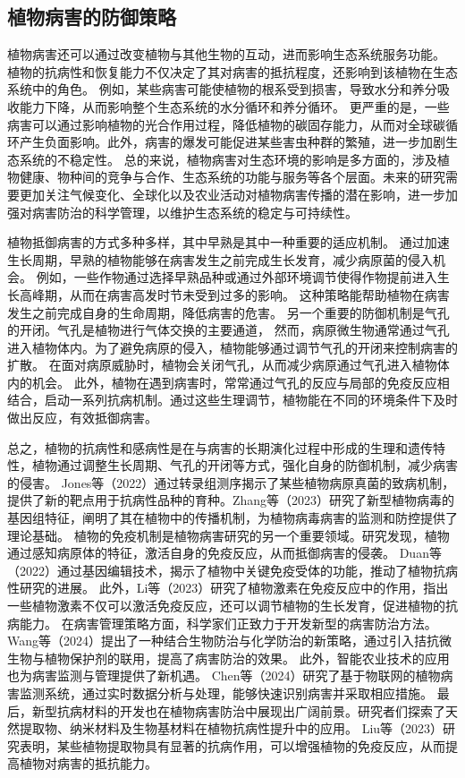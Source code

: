 \documentclass[AutoFakeBold]{LZUThesis-PgD&PhD}
\begin{document}
	
	
	\subsection{植物病害的防御策略}
	
	植物病害还可以通过改变植物与其他生物的互动，进而影响生态系统服务功能。
	植物的抗病性和恢复能力不仅决定了其对病害的抵抗程度，还影响到该植物在生态系统中的角色。
	例如，某些病害可能使植物的根系受到损害，导致水分和养分吸收能力下降，从而影响整个生态系统的水分循环和养分循环\cite{Schultz2010}。
	更严重的是，一些病害可以通过影响植物的光合作用过程，降低植物的碳固存能力，从而对全球碳循环产生负面影响\cite{Barton2011}。此外，病害的爆发可能促进某些害虫种群的繁殖，进一步加剧生态系统的不稳定性。
	总的来说，植物病害对生态环境的影响是多方面的，涉及植物健康、物种间的竞争与合作、生态系统的功能与服务等各个层面。未来的研究需要更加关注气候变化、全球化以及农业活动对植物病害传播的潜在影响，进一步加强对病害防治的科学管理，以维护生态系统的稳定与可持续性。
	
	植物抵御病害的方式多种多样，其中早熟是其中一种重要的适应机制。
	通过加速生长周期，早熟的植物能够在病害发生之前完成生长发育，减少病原菌的侵入机会。
	例如，一些作物通过选择早熟品种或通过外部环境调节使得作物提前进入生长高峰期，从而在病害高发时节未受到过多的影响。
	这种策略能帮助植物在病害发生之前完成自身的生命周期，降低病害的危害。
	另一个重要的防御机制是气孔的开闭。气孔是植物进行气体交换的主要通道，
	然而，病原微生物通常通过气孔进入植物体内。为了避免病原的侵入，植物能够通过调节气孔的开闭来控制病害的扩散。
	在面对病原威胁时，植物会关闭气孔，从而减少病原通过气孔进入植物体内的机会。
	此外，植物在遇到病害时，常常通过气孔的反应与局部的免疫反应相结合，启动一系列抗病机制。通过这些生理调节，植物能在不同的环境条件下及时做出反应，有效抵御病害。
	
	总之，植物的抗病性和感病性是在与病害的长期演化过程中形成的生理和遗传特性，植物通过调整生长周期、气孔的开闭等方式，强化自身的防御机制，减少病害的侵害。
	Jones等（2022）通过转录组测序揭示了某些植物病原真菌的致病机制，提供了新的靶点用于抗病性品种的育种\cite{jones2022}。Zhang等（2023）研究了新型植物病毒的基因组特征，阐明了其在植物中的传播机制，为植物病毒病害的监测和防控提供了理论基础\cite{zhang2023genomic}。
	植物的免疫机制是植物病害研究的另一个重要领域。研究发现，植物通过感知病原体的特征，激活自身的免疫反应，从而抵御病害的侵袭。
	Duan等（2022）通过基因编辑技术，揭示了植物中关键免疫受体的功能，推动了植物抗病性研究的进展\cite{duan2022gene}。
	此外，Li等（2023）研究了植物激素在免疫反应中的作用，指出一些植物激素不仅可以激活免疫反应，还可以调节植物的生长发育，促进植物的抗病能力\cite{li2023role}。
	在病害管理策略方面，科学家们正致力于开发新型的病害防治方法。
	Wang等（2024）提出了一种结合生物防治与化学防治的新策略，通过引入拮抗微生物与植物保护剂的联用，提高了病害防治的效果\cite{wang2024novel}。
	此外，智能农业技术的应用也为病害监测与管理提供了新机遇。
	Chen等（2024）研究了基于物联网的植物病害监测系统，通过实时数据分析与处理，能够快速识别病害并采取相应措施\cite{chen2024iot}。
	最后，新型抗病材料的开发也在植物病害防治中展现出广阔前景。研究者们探索了天然提取物、纳米材料及生物基材料在植物抗病性提升中的应用。
	Liu等（2023）研究表明，某些植物提取物具有显著的抗病作用，可以增强植物的免疫反应，从而提高植物对病害的抵抗能力\cite{liu2023natural}。
	
\end{document}
